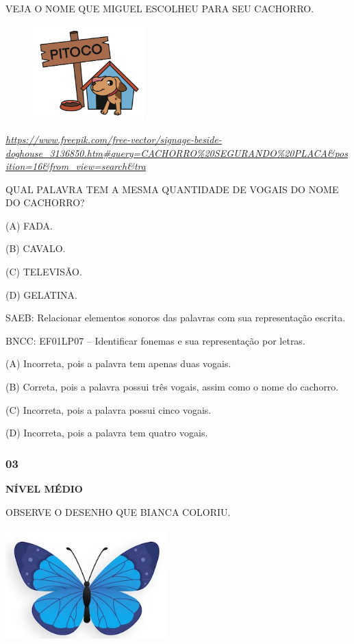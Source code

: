 VEJA O NOME QUE MIGUEL ESCOLHEU PARA SEU CACHORRO.

\includegraphics[width=2.53194in,height=1.44514in]{media/image226.png}

\href{https://www.freepik.com/free-vector/signage-beside-doghouse_3136850.htm\#query=CACHORRO\%20SEGURANDO\%20PLACA\&position=16\&from_view=search\&tra}{\emph{https://www.freepik.com/free-vector/signage-beside-doghouse\_3136850.htm\#query=CACHORRO\%20SEGURANDO\%20PLACA\&position=16\&from\_view=search\&tra}}

QUAL PALAVRA TEM A MESMA QUANTIDADE DE VOGAIS DO NOME DO CACHORRO?

(A) FADA.

(B) CAVALO.

(C) TELEVISÃO.

(D) GELATINA.

SAEB: Relacionar elementos sonoros das palavras com sua
representação escrita.

BNCC: EF01LP07 -- Identificar fonemas e sua representação por
letras.

(A) Incorreta, pois a palavra tem apenas duas vogais.

(B) Correta, pois a palavra possui três vogais, assim como o nome do
cachorro.

(C) Incorreta, pois a palavra possui cinco vogais.

(D) Incorreta, pois a palavra tem quatro vogais.

\subsubsection{03}\label{section-59}

\textbf{NÍVEL MÉDIO}

OBSERVE O DESENHO QUE BIANCA COLORIU.

\includegraphics[width=2.45833in,height=1.69432in]{media/image227.png}

